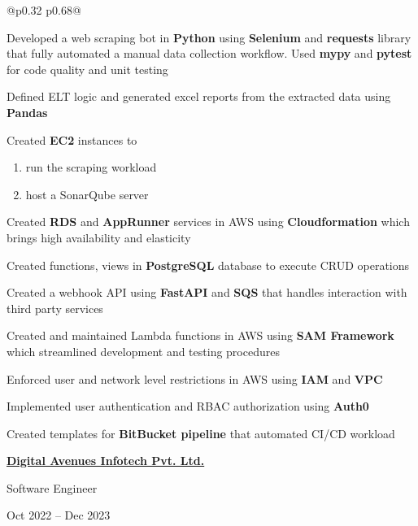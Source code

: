 \documentclass[a4paper,10pt]{article}
\begin{document}
\begin{tabularx}{\textwidth}{@{}p{0.32\textwidth} p{0.68\textwidth}@{}}
\begin{minipage}[t]{\linewidth}
\begin{experiencelist}
\item Developed a web scraping bot in \textbf{Python} using \textbf{Selenium} and \textbf{requests} library that fully automated a manual data collection workflow. Used \textbf{mypy} and \textbf{pytest} for code quality and unit testing
\item Defined ELT logic and generated excel reports from the extracted data using \textbf{Pandas}
\item Created \textbf{EC2} instances to \begin{enumerate}
    \item run the scraping workload \item host a SonarQube server
\end{enumerate}
\item Created \textbf{RDS} and \textbf{AppRunner} services in AWS using \textbf{Cloudformation} which brings high availability and elasticity
\item Created functions, views in \textbf{PostgreSQL} database to execute CRUD operations
\item Created a webhook API using \textbf{FastAPI} and \textbf{SQS} that handles interaction with third party services
\item Created and maintained Lambda functions in AWS using \textbf{SAM Framework} which streamlined development and testing procedures
\item Enforced user and network level restrictions in AWS using \textbf{IAM} and \textbf{VPC}
\item Implemented user authentication and RBAC authorization using \textbf{Auth0}
\item Created templates for \textbf{BitBucket pipeline} that automated CI/CD workload

\end{experiencelist}

\vspace{6pt}

\textbf{\href{https://www.digitalavenues.com}{Digital Avenues Infotech Pvt. Ltd.}}

Software Engineer

Oct 2022 -- Dec 2023

\begin{experiencelist}[after=\vspace{0.2pt}]


\end{experiencelist}
\end{minipage}
\end{tabularx}
\end{document}
